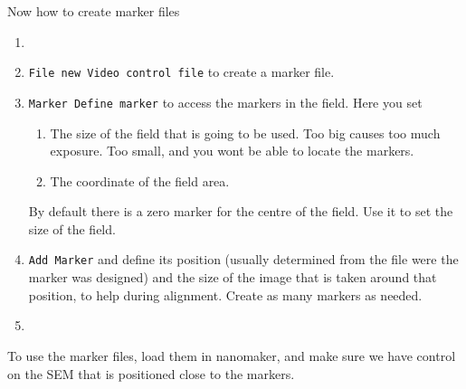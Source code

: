  Now how to create marker files
 \begin{enumerate}
 	\item {}
 	\item \texttt{File \ra new Video control file} to create a marker file.
 	\item \texttt{Marker \ra Define marker} to access the markers in the field. Here you set
 	\begin{enumerate}
 		\item The size of the field that is going to be used. Too big causes too much exposure. Too small, and you wont be able to locate the markers.
 		\item The coordinate of the field area.
 	\end{enumerate}
 	By default there is a zero marker for the centre of the field. Use it to set the size of the field.
 	\item \texttt{Add Marker} and define its position (usually determined from the file were the marker was designed) and the size of the image that is taken around that position, to help during alignment. Create as many markers as needed. 
 	\item {}
 \end{enumerate}
 
 To use the marker files, load them in nanomaker, and make sure we have control on the SEM that is positioned close to the markers.
 
